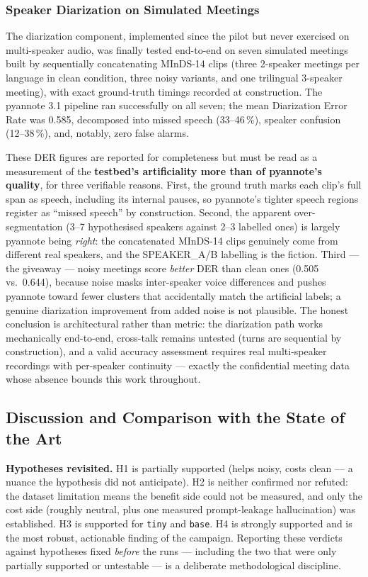 \documentclass[12pt]{report}
\begin{document}
\subsubsection{Speaker Diarization on Simulated Meetings}

The diarization component, implemented since the pilot but never exercised on multi-speaker audio, was finally tested end-to-end on seven simulated meetings built by sequentially concatenating MInDS-14 clips (three 2-speaker meetings per language in clean condition, three noisy variants, and one trilingual 3-speaker meeting), with exact ground-truth timings recorded at construction. The pyannote 3.1 pipeline ran successfully on all seven; the mean Diarization Error Rate was 0.585, decomposed into missed speech (33--46\,\%), speaker confusion (12--38\,\%), and, notably, zero false alarms.

These DER figures are reported for completeness but must be read as a measurement of the \textbf{testbed's artificiality more than of pyannote's quality}, for three verifiable reasons. First, the ground truth marks each clip's full span as speech, including its internal pauses, so pyannote's tighter speech regions register as \enquote{missed speech} by construction. Second, the apparent over-segmentation (3--7 hypothesised speakers against 2--3 labelled ones) is largely pyannote being \emph{right}: the concatenated MInDS-14 clips genuinely come from different real speakers, and the SPEAKER\_A/B labelling is the fiction. Third --- the giveaway --- noisy meetings score \emph{better} DER than clean ones (0.505 vs.\ 0.644), because noise masks inter-speaker voice differences and pushes pyannote toward fewer clusters that accidentally match the artificial labels; a genuine diarization improvement from added noise is not plausible. The honest conclusion is architectural rather than metric: the diarization path works mechanically end-to-end, cross-talk remains untested (turns are sequential by construction), and a valid accuracy assessment requires real multi-speaker recordings with per-speaker continuity --- exactly the confidential meeting data whose absence bounds this work throughout.

\subsection{Discussion and Comparison with the State of the Art}

\textbf{Hypotheses revisited.} H1 is partially supported (helps noisy, costs clean --- a nuance the hypothesis did not anticipate). H2 is neither confirmed nor refuted: the dataset limitation means the benefit side could not be measured, and only the cost side (roughly neutral, plus one measured prompt-leakage hallucination) was established. H3 is supported for \texttt{tiny} and \texttt{base}. H4 is strongly supported and is the most robust, actionable finding of the campaign. Reporting these verdicts against hypotheses fixed \emph{before} the runs --- including the two that were only partially supported or untestable --- is a deliberate methodological discipline.
\end{document}
